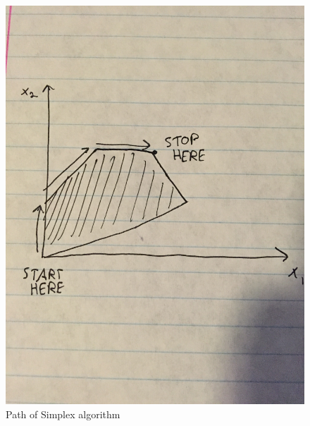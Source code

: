 \documentclass[12pt]{article}
\begin{document}
\begin{enumerate}
\begin{figure}
    \includegraphics[width=\linewidth,angle=-90]{simplex.jpg}
    \caption{Path of Simplex algorithm}
  \end{figure}
\end{enumerate}
\end{document}
